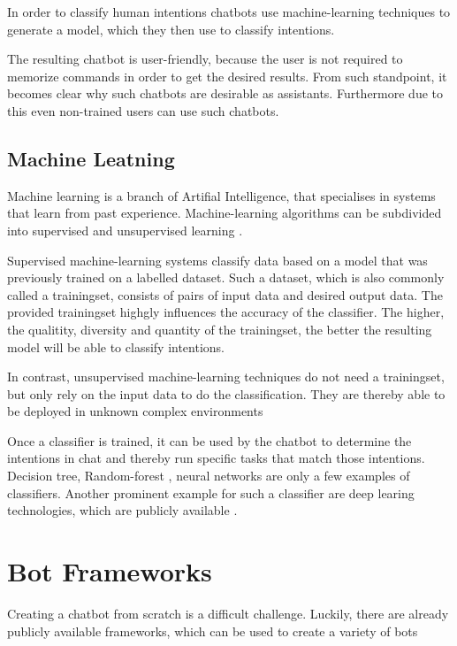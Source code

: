 In order to classify human intentions chatbots use machine-learning techniques to generate a model, which they then use to classify intentions.

The resulting chatbot is user-friendly, because the user is not required to memorize commands in order to get the desired results. From such standpoint, it becomes clear why such chatbots are desirable as assistants. Furthermore due to this even non-trained users can use such chatbots.

\subsection{Machine Leatning}
Machine learning is a branch of Artifial Intelligence, that specialises in systems that learn from past experience. Machine-learning algorithms can be subdivided into supervised and unsupervised learning \cite{MiBu16}.

Supervised machine-learning systems classify data based on a model that was previously trained on a labelled dataset. Such a dataset, which is also commonly called a trainingset, consists of pairs of input data and desired output data. The provided trainingset highgly influences the accuracy of the classifier. The higher, the qualitity, diversity and quantity of the trainingset, the better the resulting model will be able to classify intentions.

In contrast, unsupervised machine-learning techniques do not need a trainingset, but only rely on the input data to do the classification.
They are thereby able to be deployed in unknown complex environments \cite{Adam17}

Once a classifier is trained, it can be used by the chatbot to determine the intentions in chat and thereby run specific tasks that match those intentions.
Decision tree, Random-forest , neural networks are only a few examples of classifiers. Another prominent example for such a classifier are deep learing technologies, which are publicly available \cite{NLKl19}.

\section{Bot Frameworks}
Creating a chatbot from scratch is a difficult challenge. Luckily, there are already publicly available frameworks, which can be used to create a variety of bots

